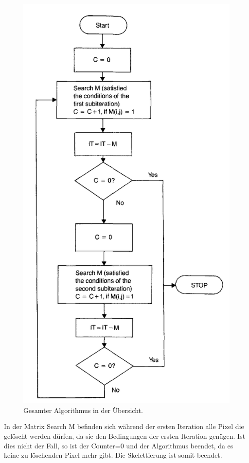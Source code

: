 \begin{figure}
\centering
\includegraphics[width=0.7\linewidth]{./Res/AlgUebersicht}
\caption{Gesamter Algorithmus in der Übersicht.}
\label{fig:AlgUebersicht}
\end{figure}

In der Matrix Search M befinden sich während der ersten Iteration alle Pixel die gelöscht werden dürfen, da sie den Bedingungen der ersten Iteration genügen. Ist dies nicht der Fall, so ist der Counter=0 und der Algorithmus beendet, da es keine zu löschenden Pixel mehr gibt. Die Skelettierung ist somit beendet.

